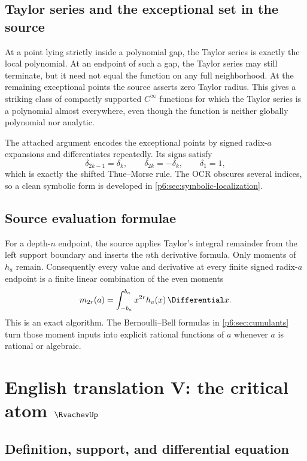 \documentclass[11pt,oneside]{article}
\numberwithin{equation}{section}
\theoremstyle{definition}
\theoremstyle{remark}
\begin{document}
\subsection{Taylor series and the exceptional set in the source}

At a point lying strictly inside a polynomial gap, the Taylor series is exactly
the local polynomial.  At an endpoint of such a gap, the Taylor series may still
terminate, but it need not equal the function on any full neighborhood.  At the
remaining exceptional points the source asserts zero Taylor radius.  This gives
a striking class of compactly supported $C^\infty$ functions for which the
Taylor series is a polynomial almost everywhere, even though the function is
neither globally polynomial nor analytic.

The attached argument encodes the exceptional points by signed radix-$a$
expansions and differentiates repeatedly.  Its signs satisfy
\[
 \delta_{2k-1}=\delta_k,\qquad
 \delta_{2k}=-\delta_k,\qquad \delta_1=1,
\]
which is exactly the shifted Thue--Morse rule.  The OCR obscures several indices,
so a clean symbolic form is developed in \cref{p6:sec:symbolic-localization}.

\subsection{Source evaluation formulae}

For a depth-$n$ endpoint, the source applies Taylor's integral remainder from the
left support boundary and inserts the $n$th derivative formula.  Only moments of
$h_a$ remain.  Consequently every value and derivative at every finite signed
radix-$a$ endpoint is a finite linear combination of the even moments
\[
 m_{2r}(a)=\int_{-b_a}^{b_a}x^{2r}h_a(x)\,\Differential x.
\]
This is an exact algorithm.  The Bernoulli--Bell formulas in
\cref{p6:sec:cumulants} turn those moment inputs into explicit rational functions
of $a$ whenever $a$ is rational or algebraic.

\section{English translation V: the critical atom \texorpdfstring{$\RvachevUp$}{up}}

\subsection{Definition, support, and differential equation}
\end{document}
